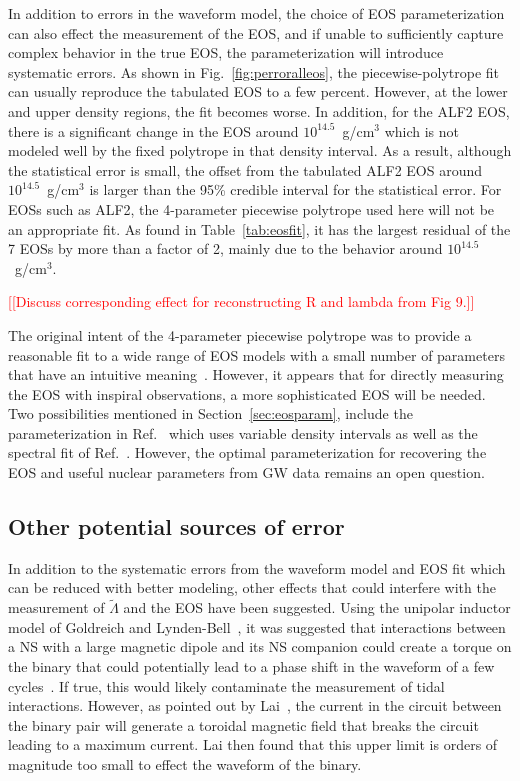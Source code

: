 \documentclass[twocolumn,prd,amssymb,aps,nofootinbib,showpacs,epsf]{revtex4}
\newcommand{\red}{\textcolor{red}}
\begin{document}
In addition to errors in the waveform model, the choice of EOS parameterization can also effect the measurement of the EOS, and if unable to sufficiently capture complex behavior in the true EOS, the parameterization will introduce systematic errors. As shown in Fig.~\ref{fig:perroralleos}, the piecewise-polytrope fit can usually reproduce the tabulated EOS to a few percent. However, at the lower and upper density regions, the fit becomes worse. In addition, for the ALF2 EOS, there is a significant change in the EOS around $10^{14.5}$~g/cm$^3$ which is not modeled well by the fixed polytrope in that density interval. As a result, although the statistical error is small, the offset from the tabulated ALF2 EOS around $10^{14.5}$~g/cm$^3$ is larger than the 95\% credible interval for the statistical error. For EOSs such as ALF2, the 4-parameter piecewise polytrope used here will not be an appropriate fit. As found in Table~\ref{tab:eosfit}, it has the largest residual of the 7 EOSs by more than a factor of 2, mainly due to the behavior around $10^{14.5}$~g/cm$^3$. 

\red{[[Discuss corresponding effect for reconstructing R and lambda from Fig 9.]]}

The original intent of the 4-parameter piecewise polytrope was to provide a reasonable fit to a wide range of EOS models with a small number of parameters that have an intuitive meaning~\cite{ReadLackey2009}. However, it appears that for directly measuring the EOS with inspiral observations, a more sophisticated EOS will be needed. Two possibilities mentioned in Section~\ref{sec:eosparam}, include the parameterization in Ref.~\cite{SteinerLattimerBrown2010} which uses variable density intervals as well as the spectral fit of Ref.~\cite{Lindblom2010}. However, the optimal parameterization for recovering the EOS and useful nuclear parameters from GW data remains an open question.

\subsection{Other potential sources of error}

In addition to the systematic errors from the waveform model and EOS fit which can be reduced with better modeling, other effects that could interfere with the measurement of $\tilde\Lambda$ and the EOS have been suggested. Using the unipolar inductor model of Goldreich and Lynden-Bell~\cite{GoldreichLyndenBell1969}, it was suggested that interactions between a NS with a large magnetic dipole and its NS companion could create a torque on the binary that could potentially lead to a phase shift in the waveform of a few cycles~\cite{Piro2012}. If true, this would likely contaminate the measurement of tidal interactions. However, as pointed out by Lai~\cite{Lai2012}, the current in the circuit between the binary pair will generate a toroidal magnetic field that breaks the circuit leading to a maximum current. Lai then found that this upper limit is orders of magnitude too small to effect the waveform of the binary.
\end{document}
